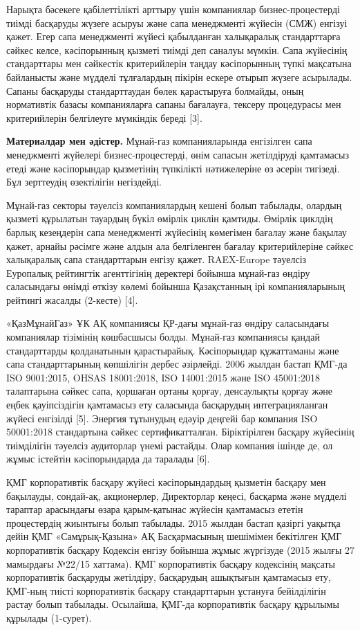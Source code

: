 \begin{multicols}{2}
Нарықта бәсекеге қабілеттілікті арттыру үшін компаниялар
бизнес-процестерді тиімді басқаруды жүзеге асыруы және сапа менеджменті
жүйесін (СМЖ) енгізуі қажет. Егер сапа менеджменті жүйесі қабылданған
халықаралық стандарттарға сәйкес келсе, кәсіпорынның қызметі тиімді деп
саналуы мүмкін. Сапа жүйесінің стандарттары мен сәйкестік критерийлерін
таңдау кәсіпорынның түпкі мақсатына байланысты және мүдделі тұлғалардың
пікірін ескере отырып жүзеге асырылады. Сапаны басқаруды стандарттаудан
бөлек қарастыруға болмайды, оның нормативтік базасы компанияларға сапаны
бағалауға, тексеру процедурасы мен критерийлерін белгілеуге мүмкіндік
береді {[}3{]}.

{\bfseries Материалдар мен әдістер.} Мұнай-газ компанияларында енгізілген
сапа менеджменті жүйелері бизнес-процестерді, өнім сапасын жетілдіруді
қамтамасыз етеді және кәсіпорындар қызметінің түпкілікті нәтижелеріне өз
әсерін тигізеді. Бұл зерттеудің өзектілігін негіздейді.

Мұнай-газ секторы тәуелсіз компаниялардың кешені болып табылады, олардың
қызметі құрылатын тауардың бүкіл өмірлік циклін қамтиды. Өмірлік циклдің
барлық кезеңдерін сапа менеджменті жүйесінің көмегімен бағалау және
бақылау қажет, арнайы рәсімге және алдын ала белгіленген бағалау
критерийлеріне сәйкес халықаралық сапа стандарттарын енгізу қажет.
RAEX-Europe тәуелсіз Еуропалық рейтингтік агенттігінің деректері бойынша
мұнай-газ өндіру саласындағы өнімді өткізу көлемі бойынша Қазақстанның
ірі компанияларының рейтингі жасалды (2-кесте) {[}4{]}.

«ҚазМұнайГаз» ҰК АҚ компаниясы ҚР-дағы мұнай-газ өндіру саласындағы
компаниялар тізімінің көшбасшысы болды. Мұнай-газ компаниясы қандай
стандарттарды қолданатынын қарастырайық. Кәсіпорындар құжаттаманы және
сапа стандарттарының көпшілігін дербес әзірлейді. 2006 жылдан бастап
ҚМГ-да ISO 9001:2015, OHSAS 18001:2018, ISO 14001:2015 және ISO
45001:2018 талаптарына сәйкес сапа, қоршаған ортаны қорғау, денсаулықты
қорғау және еңбек қауіпсіздігін қамтамасыз ету саласында басқарудың
интеграцияланған жүйесі енгізілді {[}5{]}. Энергия тұтынудың едәуір
деңгейі бар компания ISO 50001:2018 стандартына сәйкес сертификатталған.
Біріктірілген басқару жүйесінің тиімділігін тәуелсіз аудиторлар үнемі
растайды. Олар компания ішінде де, ол жұмыс істейтін кәсіпорындарда да
таралады {[}6{]}.

ҚМГ корпоративтік басқару жүйесі кәсіпорындардың қызметін басқару мен
бақылауды, сондай-ақ, акционерлер, Директорлар кеңесі, басқарма және
мүдделі тараптар арасындағы өзара қарым-қатынас жүйесін қамтамасыз
ететін процестердің жиынтығы болып табылады. 2015 жылдан бастап қазіргі
уақытқа дейін ҚМГ «Самұрық-Қазына» АҚ Басқармасының шешімімен бекітілген
ҚМГ корпоративтік басқару Кодексін енгізу бойынша жұмыс жүргізуде (2015
жылғы 27 мамырдағы №22/15 хаттама). ҚМГ корпоративтік басқару кодексінің
мақсаты корпоративтік басқаруды жетілдіру, басқарудың ашықтығын
қамтамасыз ету, ҚМГ-ның тиісті корпоративтік басқару стандарттарын
ұстануға бейілділігін растау болып табылады. Осылайша, ҚМГ-да
корпоративтік басқару құрылымы құрылады (1-сурет).
\end{multicols}

